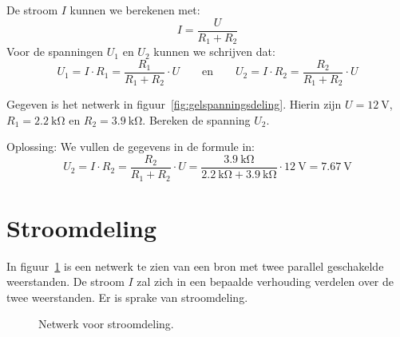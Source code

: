 De stroom $I$ kunnen we berekenen met:
%
\begin{equation}
I = \dfrac{U}{R_1+R_2}
\end{equation} 
%
Voor de spanningen $U_1$ en $U_2$ kunnen we schrijven dat:
%
\begin{equation}
U_1 = I\cdot R_1 = \dfrac{R_1}{R_1+R_2}\cdot U \qquad\text{en}\qquad U_2 = I\cdot R_2 = \dfrac{R_2}{R_1+R_2}\cdot U
\end{equation}

\begin{example}[Spanningsdeling]
Gegeven is het netwerk in figuur~\ref{fig:gelspanningsdeling}. Hierin zijn $U=\SI{12}{\volt}$, $R_1=\SI{2.2}{\kilo\ohm}$
en $R_2=\SI{3.9}{\kilo\ohm}$. Bereken de spanning $U_2$.

Oplossing: We vullen de gegevens in de formule in:
\begin{equation}
U_2 = I\cdot R_2 = \dfrac{R_2}{R_1+R_2}\cdot U = \dfrac{\SI{3.9}{\kilo\ohm}}{\SI{2.2}{\kilo\ohm}+\SI{3.9}{\kilo\ohm}}\cdot\SI{12}{\volt} = \SI{7.67}{\volt}
\end{equation}
\end{example}


\section{Stroomdeling}
In figuur~\ref{fig:gelstroomdeling} is een netwerk te zien van een bron met twee parallel
geschakelde weerstanden. De stroom $I$ zal zich in een bepaalde verhouding
verdelen over de twee weerstanden. Er is sprake van stroomdeling.

\begin{figure}[!ht]
\centering
{}
\caption{Netwerk voor stroomdeling.}
\label{fig:gelstroomdeling}
\end{figure}

